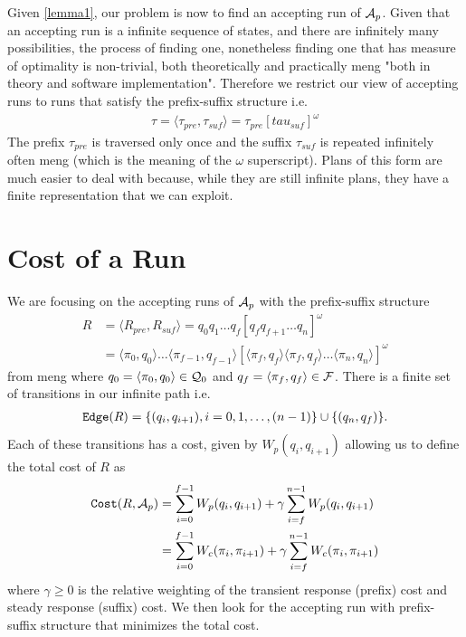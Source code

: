 Given \ref{lemma1}, our problem is now to find an accepting run of $\mathcal{A}_p$. Given that an accepting run is a infinite sequence of states, and there are infinitely many possibilities, the process of finding one, nonetheless finding one that has measure of optimality is non-trivial, both theoretically and practically meng "both in theory and software implementation". Therefore we restrict our view of accepting runs to runs that satisfy the prefix-suffix structure i.e.\
\begin{align*}
\tau = \langle \tau_{pre}, \tau_{suf} \rangle = \tau_{pre} [tau_{suf}]^\omega
\end{align*}
The prefix $\tau_{pre}$ is traversed only once and the suffix $\tau_{suf}$ is repeated infinitely often meng (which is the meaning of the $\omega$ superscript). Plans of this form are much easier to deal with because, while they are still infinite plans, they have a finite representation that we can exploit.

\section{Cost of a Run}
We are focusing on the accepting runs of $\mathcal{A}_p$ with the prefix-suffix structure
\begin{align*}
R &= \langle R_{pre}, R_{suf} \rangle = q_0 q_1 \dots q_f [q_f q_{f+1} \dots q_n]^\omega \\
&= \langle \pi_0, q_0 \rangle \dots \langle \pi_{f-1}, q_{f-1} \rangle [ \langle \pi_f , q_f \rangle \langle \pi_f , q_f \rangle \dots \langle \pi_{n}, q_n \rangle ]^\omega
\end{align*} 
from meng
where $q_0 = \langle \pi_0, q_0 \rangle \in \mathcal{Q}_0$ and $q_f = \langle \pi_f , q_f \rangle \in \mathcal{F}$. There is a finite set of transitions in our infinite path i.e.\ 
\begin{align*}
\texttt{Edge} (R) = \{(q_i, q_{i+1}) , i = 0,1,\dots ,(n-1)\} \cup \{(q_n , q_f ) \}.
\end{align*}
Each of these transitions has a cost, given by $W_p(q_i,q_{i+1})$ allowing us to define the total cost of $R$ as
\begin{align*}
\texttt{Cost} (R, \mathcal{A}_p) &= \sum_{i=0}^{f-1} W_p(q_i,q_{i+1}) + \gamma \sum_{i=f}^{n-1} W_p(q_i,q_{i+1}) \\
&= \sum_{i=0}^{f-1} W_c(\pi_i,\pi_{i+1}) + \gamma \sum_{i=f}^{n-1} W_c(\pi_i, \pi_{i+1})
\end{align*}
where $\gamma \geq 0$ is the relative weighting of the transient response (prefix) cost and steady response (suffix) cost. We then look for the accepting run with prefix-suffix structure that minimizes the total cost. 

